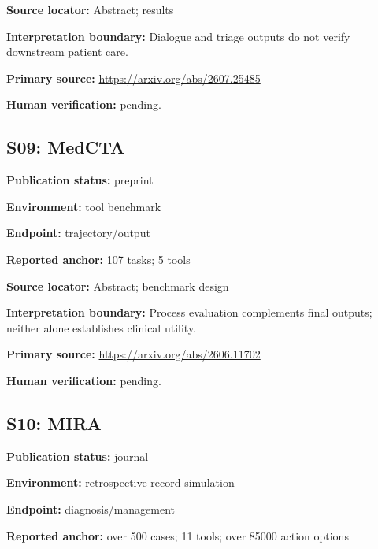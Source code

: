 \documentclass[journal,onecolumn,10pt]{IEEEtran}
\begin{document}
\noindent\textbf{Source locator:} Abstract; results\par

\noindent\textbf{Interpretation boundary:} Dialogue and triage outputs do not verify downstream patient care.\par

\noindent\textbf{Primary source:} \url{https://arxiv.org/abs/2607.25485}\par
\noindent\textbf{Human verification:} pending.

\subsection*{S09: MedCTA}

\noindent\textbf{Publication status:} preprint\par

\noindent\textbf{Environment:} tool benchmark\par

\noindent\textbf{Endpoint:} trajectory/output\par

\noindent\textbf{Reported anchor:} 107 tasks; 5 tools\par

\noindent\textbf{Source locator:} Abstract; benchmark design\par

\noindent\textbf{Interpretation boundary:} Process evaluation complements final outputs; neither alone establishes clinical utility.\par

\noindent\textbf{Primary source:} \url{https://arxiv.org/abs/2606.11702}\par
\noindent\textbf{Human verification:} pending.

\subsection*{S10: MIRA}

\noindent\textbf{Publication status:} journal\par

\noindent\textbf{Environment:} retrospective-record simulation\par

\noindent\textbf{Endpoint:} diagnosis/management\par

\noindent\textbf{Reported anchor:} over 500 cases; 11 tools; over 85000 action options\par
\end{document}
